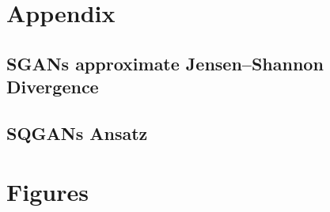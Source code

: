 \chapter{Appendix}

\section{SGANs approximate Jensen–Shannon Divergence}
\label{apx:JSD}




\section{SQGANs Ansatz}
\label{apx:sqgans_ansatz}

\chapter{Figures}
